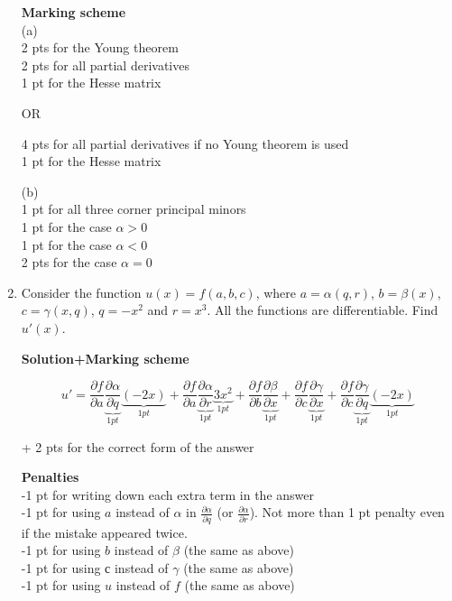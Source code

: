 \begin{enumerate}
  \textbf{Marking scheme}\\
  (a)\\
  2 pts for the Young theorem\\
  2 pts for all partial derivatives\\
  1 pt for the Hesse matrix

  OR

  4 pts for all partial derivatives if no Young theorem is used\\
  1 pt for the Hesse matrix

  (b)\\
  1 pt for all three corner principal minors\\
  1 pt for the case $\alpha > 0$\\
  1 pt for the case $\alpha <0$\\
  2 pts for the case $\alpha =0$


  \item

  Consider the function $u(x)=f(a,b,c)$, where $a=\alpha(q,r)$, $b=\beta(x)$, $c=\gamma(x,q)$, $q=-x^2$ and $r=x^3$. All the functions are differentiable. Find $u'(x)$.

  \textbf{Solution+Marking scheme}

  \[
  u'=\frac{\partial f}{\partial a}\underbrace{\frac{\partial \alpha}{\partial q}}_{1 pt}\underbrace{(-2x)}_{1 pt}+\frac{\partial f}{\partial a}\underbrace{\frac{\partial \alpha}{\partial r}}_{1 pt}\underbrace{3x^2}_{1 pt}+\frac{\partial f}{\partial b}\underbrace{\frac{\partial \beta}{\partial x}}_{1 pt}+\frac{\partial f}{\partial c}\underbrace{\frac{\partial \gamma}{\partial x}}_{1 pt}+\frac{\partial f}{\partial c}\underbrace{\frac{\partial\gamma}{\partial q}}_{1 pt}\underbrace{(-2x)}_{1 pt}
  \]

  + 2 pts for the correct form of the answer

  \textbf{Penalties}\\
  -1 pt for writing down each extra term in the answer\\
  -1 pt for using $a$ instead of $\alpha$ in $\frac{\partial \alpha}{\partial q}$ (or $\frac{\partial \alpha}{\partial r}$). Not more than 1 pt penalty even if the mistake appeared twice.\\
  -1 pt for using $b$ instead of $\beta$ (the same as above)\\
  -1 pt for using $с$ instead of $\gamma$ (the same as above)\\
  -1 pt for using $u$ instead of $f$ (the same as above)


\end{enumerate}
